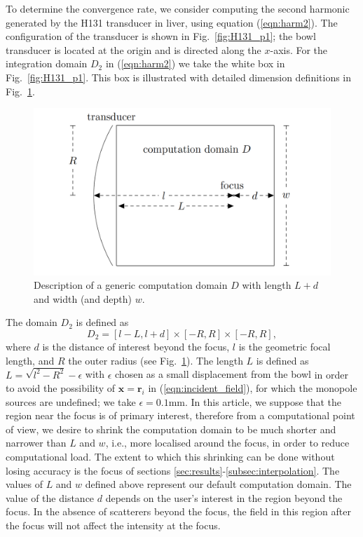 \documentclass[11pt]{article}
\numberwithin{equation}{section}
\newcommand{\br}{\mathbf{r}}
\newcommand{\bx}{\mathbf{x}}
\newcommand{\red}[1]{{\color{black} #1}}
\begin{document}
To determine the convergence rate, we consider computing the second harmonic 
generated by the H131 transducer in liver, using equation (\ref{eqn:harm2}).
The configuration of the transducer is shown in Fig.~\ref{fig:H131_p1}; the bowl
transducer is located at the origin and is directed along the $x$-axis.
For the integration domain $D_2$ in (\ref{eqn:harm2}) we take the white box in 
Fig.~\ref{fig:H131_p1}. This box is illustrated with detailed dimension definitions 
in Fig.~\ref{fig:domain_dimensions}. 
\begin{figure}
    \includegraphics[width=\columnwidth]{Figure1.pdf}
    \caption{Description of a generic computation domain $D$
    with length $L+d$ and width (and depth) $w$.}
    \label{fig:domain_dimensions}
\end{figure}
The domain $D_2$ is defined as 
\begin{equation}
    D_2 = [l-L, l+d] \times [-R, R] \times [-R, R],
    \label{eqn:domain}
\end{equation}
where $d$ is the distance of interest beyond the focus, $l$ is the geometric 
focal length, and $R$ the outer radius (see Fig.~\ref{fig:domain_dimensions}).
The length $L$ is defined as $L = \sqrt{l^2-R^2} - \epsilon$ with $\epsilon$ 
chosen as a small displacement 
from the bowl \red{in order to avoid the possibility of $\bx=\br_i$ in (\ref{eqn:incident_field}),
for which the monopole sources are undefined}; we take $\epsilon = 0.1$mm. 
\red{In this article, we suppose that the region near the focus is of 
primary interest, therefore from a computational point of view, we desire to 
shrink the computation domain to be much shorter and narrower than $L$ and $w$, i.e., 
more localised around the focus, in order to reduce computational load.
The extent to which this shrinking can be done without losing accuracy is the focus 
of sections \ref{sec:results}-\ref{subsec:interpolation}. The values of $L$ and $w$
defined above represent our default computation domain. The value of the distance $d$
depends on the user's interest in the region beyond the focus. In the absence of 
scatterers beyond the focus, the field in this region after the focus will not affect the 
intensity at the focus.}
\end{document}
